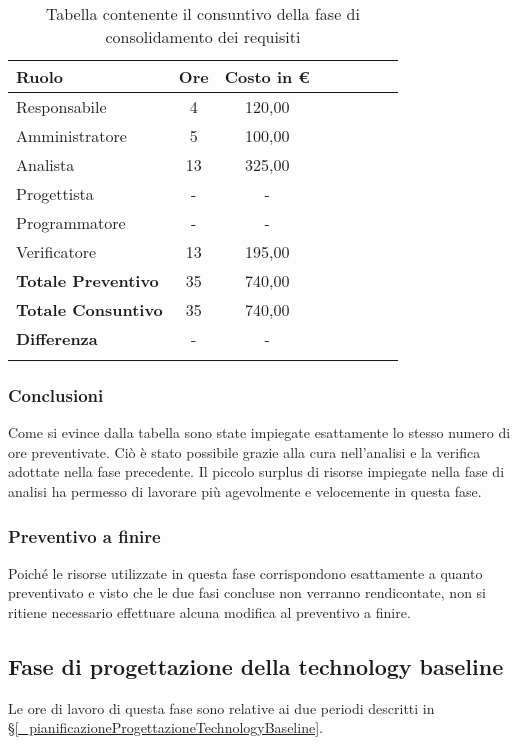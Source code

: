 \begin{longtable}{|l|c|c|c|c|c|c|c|}
	\hline
	\rowcolor{lighter-grayer}
	\textbf{Ruolo}             & \textbf{Ore} & \textbf{Costo in €} \\
	\hline
	\endfirsthead

	\hline
	Responsabile               & 4           & 120,00              \\
	\hline
	\hline
	Amministratore             & 5       & 100,00      \\
	\hline
	\hline
	Analista                   & 13       & 325,00   \\
	\hline
	\hline
	Progettista                & -            & -                   \\
	\hline
	\hline
	Programmatore              & -            & -                   \\
	\hline
	\hline
	Verificatore               & 13       & 195,00    \\
	\hline
	\textbf{Totale Preventivo} & 35          & 740,00            \\
	\hline
	\hline
	\textbf{Totale Consuntivo} & 35          & 740,00            \\
	\hline
	\hline
	\textbf{Differenza}        & -           & -            \\
	\hline
	\rowcolor{white}
	\caption{Tabella contenente il consuntivo della fase di consolidamento dei requisiti}
\end{longtable}
\subsubsection{Conclusioni}
Come si evince dalla tabella sono state impiegate esattamente lo stesso numero di ore preventivate. Ciò è stato possibile grazie alla cura nell'analisi e la verifica adottate nella fase precedente. Il piccolo surplus di risorse impiegate nella fase di analisi ha permesso di lavorare più agevolmente e velocemente in questa fase.

\subsubsection{Preventivo a finire}
Poiché le risorse utilizzate in questa fase corrispondono esattamente a quanto preventivato e visto che le due fasi concluse non verranno rendicontate, non si ritiene necessario effettuare alcuna modifica al preventivo a finire.


\subsection{Fase di progettazione della technology baseline} \label{_consuntivoConsolidamentoDeiRequisiti}
Le ore di lavoro di questa fase sono relative ai due periodi descritti in \S\ref{_pianificazioneProgettazioneTechnologyBaseline}.

